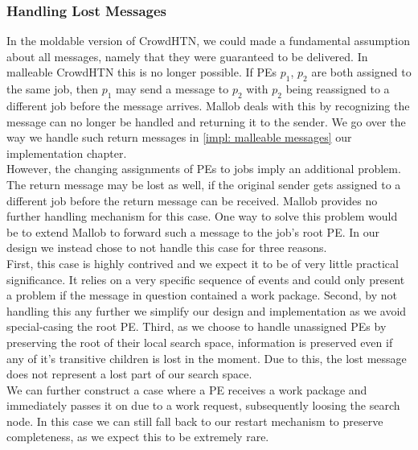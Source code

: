 \subsubsection{Handling Lost Messages}
\label{malleable: messages}
In the moldable version of CrowdHTN, we could made a fundamental assumption about all messages, namely that they were guaranteed to be delivered. In malleable CrowdHTN this is no longer possible. If PEs $p_1$, $p_2$ are both assigned to the same job, then $p_1$ may send a message to $p_2$ with $p_2$ being reassigned to a different job before the message arrives. Mallob deals with this by recognizing the message can no longer be handled and returning it to the sender. We go over the way we handle such return messages in \ref{impl: malleable messages} our implementation chapter. \\
However, the changing assignments of PEs to jobs imply an additional problem. The return message may be lost as well, if the original sender gets assigned to a different job before the return message can be received. Mallob provides no further handling mechanism for this case. One way to solve this problem would be to extend Mallob to forward such a message to the job's root PE. In our design we instead chose to not handle this case for three reasons. \\
First, this case is highly contrived and we expect it to be of very little practical significance. It relies on a very specific sequence of events and could only present a problem if the message in question contained a work package. Second, by not handling this any further we simplify our design and implementation as we avoid special-casing the root PE. Third, as we choose to handle unassigned PEs by preserving the root of their local search space, information is preserved even if any of it's transitive children is lost in the moment. Due to this, the lost message does not represent a lost part of our search space. \\
We can further construct a case where a PE receives a work package and immediately passes it on due to a work request, subsequently loosing the search node. In this case we can still fall back to our restart mechanism to preserve completeness, as we expect this to be extremely rare.
